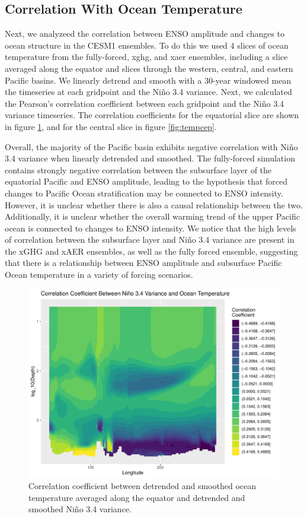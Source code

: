 \documentclass[11pt]{article}
\begin{document}
\subsection{Correlation With Ocean Temperature}
\label{sec:org4afb475}
Next, we analyzeed the correlation between ENSO amplitude and changes to ocean structure in the CESM1 ensembles. To do this we used 4 slices of ocean temperature from the fully-forced, xghg, and xaer ensembles, including a slice averaged along the equator and slices through the western, central, and eastern Pacific basins. We linearly detrend and smooth with a 30-year windowed mean the timeseries at each gridpoint and the Niño 3.4 variance. Next, we calculated the Pearson's correlation coefficient between each gridpoint and the Niño 3.4 variance timeseries. The correlation coefficients for the equatorial slice are shown in figure \ref{fig:tempdt}, and for the central slice in figure \ref{fig:tempcep}.

Overall, the majority of the Pacific basin exhibits negative correlation with Niño 3.4 variance when linearly detrended and smoothed. The fully-forced simulation contains strongly negative correlation between the subsurface layer of the equatorial Pacific and ENSO amplitude, leading to the hypothesis that forced changes to Pacific Ocean stratification may be connected to ENSO intensity. However, it is unclear whether there is also a causal relationship between the two. Additionally, it is unclear whether the overall warming trend of the upper Pacific ocean is connected to changes to ENSO intensity. We notice that the high levels of correlation between the subsurface layer and Niño 3.4 variance are present in the xGHG and xAER ensembles, as well as the fully forced ensemble, suggesting that there is a relationship between ENSO amplitude and subsurface Pacific Ocean temperature in a variety of forcing scenarios.

\begin{figure}[htbp]
\centering
\includegraphics[width=.9\linewidth]{../../data/figures/tempdt.pdf}
\caption{\label{fig:tempdt}Correlation coefficient between detrended and smoothed ocean temperature averaged along the equator and detrended and smoothed Niño 3.4 variance.}
\end{figure}
\end{document}
